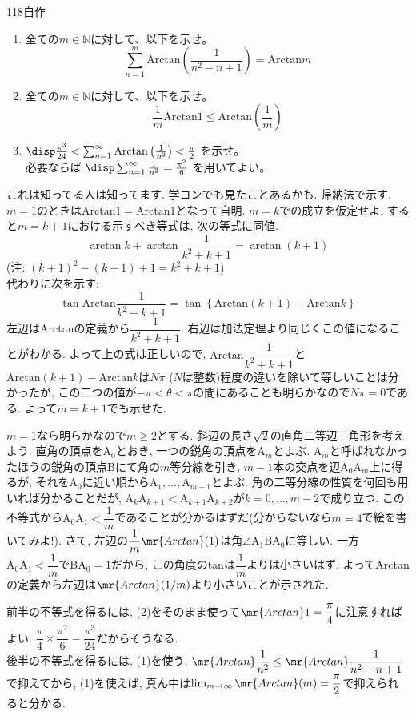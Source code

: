 \begin{thm}{118}{}{自作}
 \begin{enumerate}
  \item 全ての$m\in\mathbb{N}$に対して、以下を示せ。
	\[ \sum_{n=1}^m \mathrm{Arctan} \left(\frac{1}{n^2-n+1}\right) = \mathrm{Arctan} m \]
  \item 全ての$m\in\mathbb{N}$に対して、以下を示せ。
	\[ \frac{1}{m}\mathrm{Arctan}1 \le \mathrm{Arctan}\left(\frac{1}{m}\right) \]
  \item $\disp \frac{\pi^3}{24} < \sum_{n=1}^\infty \mathrm{Arctan}\left(\frac{1}{n^2}\right) < \frac{\pi}{2}$ を示せ。 \\
	必要ならば $\disp \sum_{n=1}^\infty \frac{1}{n^2}=\frac{\pi^2}{6}$ を用いてよい。
 \end{enumerate}
\end{thm}

 これは知ってる人は知ってます. 学コンでも見たことあるかも. 
帰納法で示す. $m=1$のときは$\mathrm{Arctan}1 = \mathrm{Arctan}1$となって自明. $m=k$での成立を仮定せよ. すると$m=k+1$における示すべき等式は, 次の等式に同値.
\[\arctan{k} + \arctan{\dfrac{1}{k^2+k+1}} = \arctan{(k+1)}\]
(注: $(k+1)^2 - (k+1) + 1 = k^2+k+1$) \\
代わりに次を示す: 
\[
\tan{\mathrm{Arctan}{\dfrac{1}{k^2+k+1}}} = \tan{\left\{ \mathrm{Arctan}{(k+1)} - \mathrm{Arctan}{k}\right\}}
\]
左辺はArctanの定義から$\dfrac{1}{k^2+k+1}$. 右辺は加法定理より同じくこの値になることがわかる. よって上の式は正しいので, $\mathrm{Arctan}{\dfrac{1}{k^2+k+1}}$と$\mathrm{Arctan}{(k+1)} - \mathrm{Arctan}{k}$は$N\pi$ ($N$は整数)程度の違いを除いて等しいことは分かったが, この二つの値が$-\pi < \theta < \pi$の間にあることも明らかなので$N\pi = 0$である. よって$m=k+1$でも示せた. 

$m=1$なら明らかなので$m\geq 2$とする.
斜辺の長さ$\sqrt{2}$の直角二等辺三角形を考えよう.  直角の頂点を$\mathrm{A}_0$とおき, 一つの鋭角の頂点を$\mathrm{A}_m$とよぶ. $\mathrm{A}_m$と呼ばれなかったほうの鋭角の頂点$\mathrm{B}$にて角の$m$等分線を引き, $m-1$本の交点を辺$\mathrm{A}_0\mathrm{A}_m$上に得るが,  それを$\mathrm{A}_0$に近い順から$\mathrm{A}_1,\dots, \mathrm{A}_{m-1}$とよぶ. 角の二等分線の性質を何回も用いれば分かることだが, $\mathrm{A}_k\mathrm{A}_{k+1} < \mathrm{A}_{k+1} \mathrm{A}_{k+2}$が$k=0,\dots, m-2$で成り立つ. この不等式から$\mathrm{A}_0 \mathrm{A}_1 < \dfrac{1}{m}$であることが分かるはずだ(分からないなら$m=4$で絵を書いてみよ!). さて, 左辺の$\dfrac{1}{m}\mr{Arctan}(1)$は角$\angle{\mathrm{A}_1\mathrm{B}\mathrm{A}_0}$に等しい. 一方$\mathrm{A}_0\mathrm{A}_1 < \dfrac{1}{m}$で$\mathrm{B}\mathrm{A}_0 = 1$だから, この角度のtanは$\dfrac{1}{m}$よりは小さいはず. よってArctanの定義から左辺は$\mr{Arctan}(1/m)$より小さいことが示された.

前半の不等式を得るには, (2)をそのまま使って$\mr{Arctan}1 = \dfrac{\pi}{4}$に注意すればよい. $\dfrac{\pi}{4}\times \dfrac{\pi^2}{6} = \dfrac{\pi^3}{24}$だからそうなる. \\
後半の不等式を得るには, (1)を使う. $\mr{Arctan}\dfrac{1}{n^2} \leq \mr{Arctan}\dfrac{1}{n^2-n+1}$で抑えてから, (1)を使えば, 真ん中は$\lim_{m\to \infty}\mr{Arctan}(m) = \dfrac{\pi}{2}$で抑えられると分かる. 


